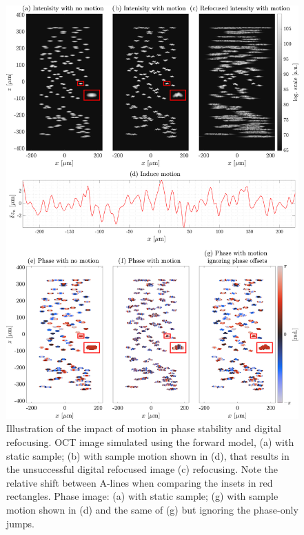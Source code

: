 \begin{figure}[]
	\centering
	\includegraphics[width=.95\textwidth]{Figures/TheoreticalBasis/MotionEx.pdf}
	\caption[Illustration of the impact of motion in phase stability and digital refocusing.]{Illustration of the impact of motion in phase stability and digital refocusing. OCT image simulated using the forward model, (a) with static sample; (b) with sample motion shown in (d), that results in the unsuccessful digital refocused image (c) refocusing. Note the relative shift between A-lines when comparing the insets in red rectangles. Phase image: (a) with static sample; (g) with sample motion shown in (d) and the same of (g) but ignoring the phase-only jumps.}
	\label{fig:motionEx}
\end{figure}

